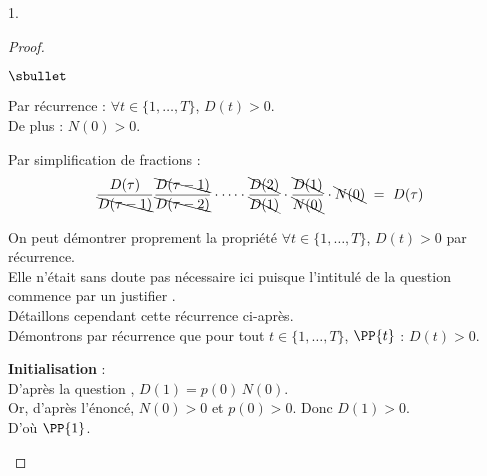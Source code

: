 \documentclass[11pt]{article}%
\begin{document}
\begin{noliste}{1.}
  \begin{proof}~
    \begin{noliste}{$\sbullet$}
      \item Par récurrence : $\forall t \in \{1, \ldots, T\}$, 
      $D(t) >0$.\\
      De plus : $N(0)>0$.
      
      
      \newpage
      
      
      \item Par simplification de fractions :
      \[
	\dfrac{D(\tau)}{\bcancel{D(\tau-1)}}
        \dfrac{\bcancel{D(\tau-1)}}{\bcancel{D(\tau-2)}} 
        \cdot \cdots \cdot 
	\dfrac{\bcancel{D(2)}}{\bcancel{D(1)}}
	\cdot \dfrac{\bcancel{D(1)}}{\bcancel{N(0)}} 
	\cdot \bcancel{N(0)}
	\ = \ D(\tau)
      \]
    \end{noliste}
    
    \begin{remark}
      On peut démontrer proprement la propriété \og $\forall t \in 
      \{1, \ldots, T\}$, $D(t) >0$ par récurrence.\\
      Elle n'était sans doute pas nécessaire ici puisque l'intitulé de 
      la question commence par un \og justifier \fg{}.\\
      Détaillons cependant cette récurrence ci-après.\\
      Démontrons par récurrence que pour tout $t \in \{1, \ldots, T\}$,
      $\PP{t}$ : $D(t) >0$.
      \begin{noliste}{\fitem}
        \item {\bf Initialisation} :\\
        D'après la question , $D(1) = p(0) \, N(0)$.\\
        Or, d'après l'énoncé, $N(0)>0$ et $p(0)>0$. Donc $D(1) >0$.\\
        D'où $\PP{1}$.
        

\end{noliste}
\end{remark}
\end{proof}
\end{noliste}
\end{document}
